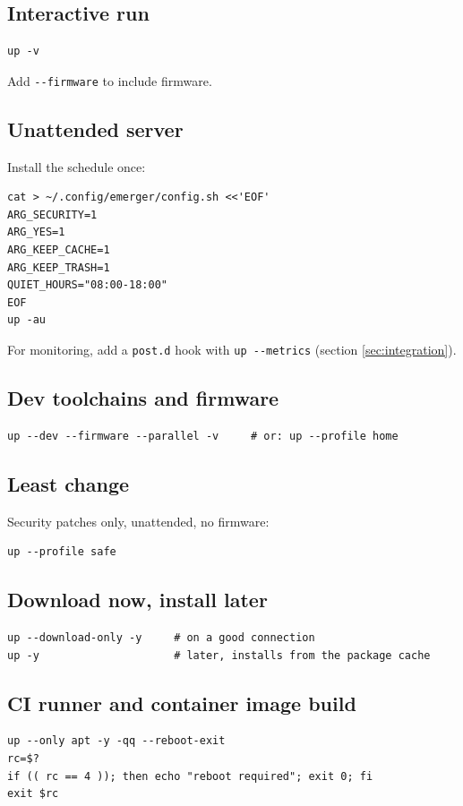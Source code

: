 \documentclass[11pt,a4paper]{article}
\begin{document}
\subsection{Interactive run}
\begin{lstlisting}[language=bashplus]
up -v
\end{lstlisting}
Add \texttt{-{}-firmware} to include firmware.

\subsection{Unattended server}
Install the schedule once:

\begin{lstlisting}[language=bashplus]
cat > ~/.config/emerger/config.sh <<'EOF'
ARG_SECURITY=1
ARG_YES=1
ARG_KEEP_CACHE=1
ARG_KEEP_TRASH=1
QUIET_HOURS="08:00-18:00"
EOF
up -au
\end{lstlisting}

For monitoring, add a \texttt{post.d} hook with \texttt{up -{}-metrics}
(section \ref{sec:integration}).

\subsection{Dev toolchains and firmware}
\begin{lstlisting}[language=bashplus]
up --dev --firmware --parallel -v     # or: up --profile home
\end{lstlisting}

\subsection{Least change}
Security patches only, unattended, no firmware:

\begin{lstlisting}[language=bashplus]
up --profile safe
\end{lstlisting}

\subsection{Download now, install later}
\begin{lstlisting}[language=bashplus]
up --download-only -y     # on a good connection
up -y                     # later, installs from the package cache
\end{lstlisting}

\subsection{CI runner and container image build}
\begin{lstlisting}[language=bashplus]
up --only apt -y -qq --reboot-exit
rc=$?
if (( rc == 4 )); then echo "reboot required"; exit 0; fi
exit $rc
\end{lstlisting}
\end{document}
